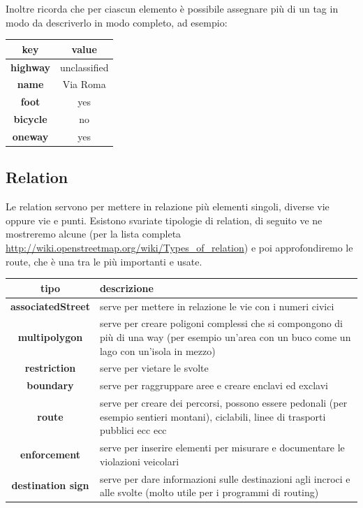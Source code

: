 \documentclass[a4paper,twoside,12pt,]{article}
\newcommand{\key}[1]{\textsf{\textbf{#1}}}
\newcommand{\val}[1]{\textsf{#1}}
\begin{document}
Inoltre ricorda che per ciascun elemento è possibile assegnare più di un tag in modo da descriverlo in modo completo, ad esempio:
\begin{center}
 \begin{tabular}{cc}
  \toprule
   \textbf{key} & \textbf{value} \\
  \midrule
   \key{highway} & \val{unclassified} \\
   \key{name} & \val{Via Roma} \\
   \key{foot} & \val{yes} \\
   \key{bicycle} & \val{no} \\
   \key{oneway} & \val{yes} \\
  \bottomrule
 \end{tabular}
\end{center}

\subsection{Relation}
Le relation servono per mettere in relazione più elementi singoli, diverse vie oppure vie e punti. Esistono svariate tipologie di relation, di seguito ve ne mostreremo alcune (per la lista completa \url{http://wiki.openstreetmap.org/wiki/Types_of_relation}) e poi approfondiremo le route, che è una tra le più importanti e usate.
\begin{center}
 \begin{tabular}{c p{9cm}}
  \toprule
   \textbf{tipo} & \textbf{descrizione} \\
  \midrule
   \key{associatedStreet} & serve per mettere in relazione le vie con i numeri civici \\
   \key{multipolygon} & serve per creare poligoni complessi che si compongono di più di una way (per esempio un'area con un buco come un lago con un'isola in mezzo) \\
   \key{restriction}	& serve per vietare le svolte \\
   \key{boundary}	& serve per raggruppare aree e creare enclavi ed exclavi \\
   \key{route} & serve per creare dei percorsi, possono essere pedonali (per esempio sentieri montani), ciclabili, linee di trasporti pubblici ecc ecc \\
   \key{enforcement} & serve per inserire elementi per misurare e documentare le violazioni veicolari \\
   \key{destination sign} & serve per dare informazioni sulle destinazioni agli incroci e alle svolte (molto utile per i programmi di routing) \\
  \bottomrule
\end{tabular}
\end{center}
\end{document}
